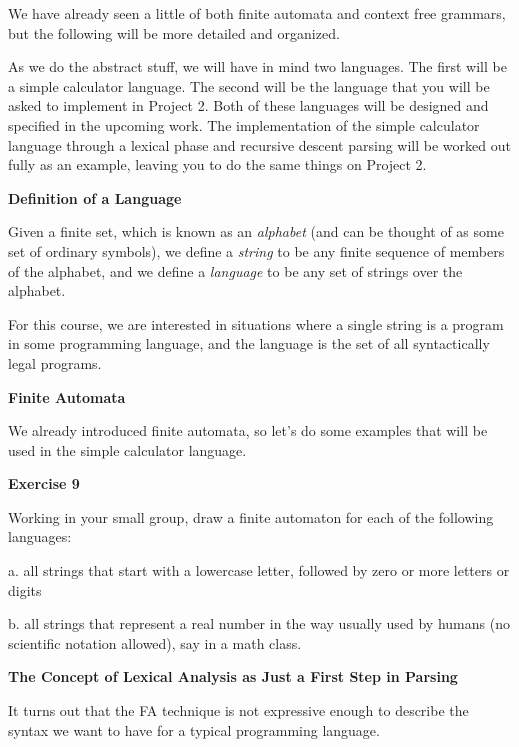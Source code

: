 We have already seen a little of both finite automata and context free grammars, but the following will be
more detailed and organized.
\medskip

As we do the abstract stuff, we will have in mind two languages.  The first will be a
simple calculator language.  The second will be the language that you will be asked to
implement in Project 2.  Both of these languages will be designed and specified in the
upcoming work.  The implementation of the simple calculator language through 
a lexical phase and 
recursive descent parsing will be worked out fully as an example, leaving you to do
the same things on Project 2.
\border

{\bf Definition of a Language}
\medskip

Given a finite set, which is known as an {\it alphabet} (and can be thought of as some set
of ordinary symbols), we define a {\it string\/}
to be any finite sequence of members of the alphabet, and we define a {\it language\/} to 
be any set of strings over the alphabet.
\medskip

\In
     For this course, we are interested in situations where a single string is a program in some
     programming language, and the language is the set of all syntactically legal programs.
\medskip
\Out
\border

{\bf Finite Automata}
\medskip

We already introduced finite automata, so let's do some examples that will
be used in the simple calculator language.
\border

{\bf Exercise 9}
\medskip

Working in your small group, draw a finite automaton for each of the following languages:
\medskip

\item{a.}  all strings that start with a lowercase letter, followed by zero or more letters or digits
\medskip

\item{b.}  all strings that represent a real number in the way usually
used by humans (no scientific notation allowed), say in a math class.

\border
\Outdent

{\bf The Concept of Lexical Analysis as Just a First Step in Parsing}
\medskip

It turns out that the FA technique is not expressive enough to describe the syntax we want
to have for a typical programming language.  
\medskip

